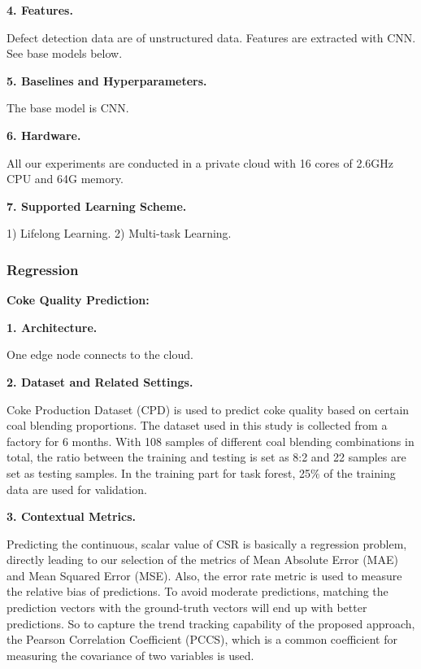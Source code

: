 \textbf{4. Features.}

Defect detection data are of unstructured data. Features are extracted with CNN. See base models below.

\textbf{5. Baselines and Hyperparameters.}

The base model is CNN. 


\textbf{6. Hardware.}

All our experiments are conducted in a private cloud with 16 cores of 2.6GHz CPU and 64G memory.

\textbf{7. Supported Learning Scheme.}

1) Lifelong Learning. 2) Multi-task Learning. 


\subsubsection{Regression}

\textbf{Coke Quality Prediction:} 

\textbf{1. Architecture.}

One edge node connects to the cloud. 

\textbf{2. Dataset and Related Settings.}

Coke Production Dataset (CPD) is used to predict coke quality based on certain coal blending proportions. The dataset used in this study is collected from a factory for 6 months. With 108 samples of different coal blending combinations in total, the ratio between the training and testing is set as 8:2 and 22 samples are set as testing samples. In the training part for task forest, 25$\%$ of the training data are used for validation. 

\textbf{3. Contextual Metrics.} 

Predicting the continuous, scalar value of CSR is basically a regression problem, directly leading to our selection of the metrics of Mean Absolute Error (MAE) and Mean Squared Error (MSE). Also, the error rate metric is used to measure the relative bias of predictions. 
To avoid moderate predictions, matching the prediction vectors with the ground-truth vectors will end up with better predictions.
So to capture the trend tracking capability of the proposed approach, the Pearson Correlation Coefficient (PCCS), which is a common coefficient for measuring the covariance of two variables is used.

